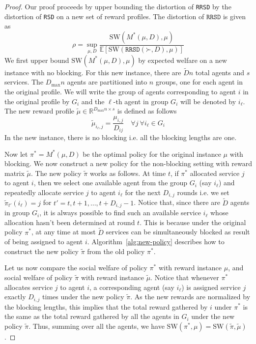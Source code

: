 \documentclass[letterpaper,11pt]{article}
\newcommand{\SW}{\textrm{SW}}
\begin{document}
\begin{proof}
    
Our proof proceeds by upper bounding the distortion of \texttt{RRSD} by the distortion of \texttt{RSD} on a new set of reward profiles. The distortion of $\texttt{RRSD}$ is given as
     $$
     \rho = \sup_{\mu,D} \frac{\textrm{SW}(M^{*}(\mu, D), \mu)}{\mathbb{E}[\textrm{SW}(\texttt{RRSD}(\mathord{\succ}, D), \mu)]}
     $$
     We first upper bound $\textrm{SW}(M^{*}(\mu, D), \mu)$ by expected welfare on a new instance with no blocking. For this new instance, there are $\tilde{D} n$ total agents and $s$ services. The $D_{\max} n$ agents are partitioned into $n$ groups, one for each agent in the original profile. We will write the group of agents corresponding to agent $i$ in the original profile by $G_i$ and the $\ell$-th agent in group $G_i$ will be denoted by $i_\ell$. The new reward profile $\tilde{\mu} \in \mathbb{R}^{D_{\max} n \times s}$ is defined as follows
     $$
     \tilde{\mu}_{i_\ell, j} = \frac{\mu_{i,j}}{D_{ij}} \quad \forall j \ \forall i_\ell \in G_i
     $$
     In the new instance, there is no blocking i.e. all the blocking lengths are one. 
     
     Now let $\pi^* = M^*(\mu,D)$ be the optimal policy for the original instance $\mu$ with blocking. We now construct a new policy for the non-blocking setting with reward matrix $\tilde{\mu}$. The new policy $\tilde{\pi}$ works as follows. At time $t$, if $\pi^*$ allocated service $j$  to agent $i$, then we select one available agent from the group $G_i$ (say $i_\ell$) and repeatedly allocate service $j$ to agent $i_\ell$ for the next $D_{i,j}$ rounds i.e. we set $\tilde{\pi}_{t'}(i_\ell) = j$ for $t'=t, t+1,\ldots, t+D_{i,j} - 1$. Notice that, since there are $\tilde{D}$ agents in group $G_i$, it is always possible to find such an available service $i_{\ell}$ whose allocation hasn't been determined at round $t$. This is because under the original policy $\pi^*$, at any time at most $\tilde{D}$ services can be simultaneously blocked as result of being assigned to agent $i$. Algorithm~\ref{alg:new-policy} describes how to construct the new policy $\tilde{\pi}$ from the old policy $\pi^*$.
     
     Let us now compare the social welfare of policy $\pi^*$ with reward instance $\mu$, and social welfare of policy $\tilde{\pi}$ with reward instance $\tilde{\mu}$. Notice that whenever $\pi^*$ allocates service $j$ to agent $i$, a corresponding agent (say $i_\ell$) is assigned service $j$ exactly $D_{i,j}$ times under the new policy $\tilde{\pi}$. As the new rewards are normalized by the blocking lengths, this implies that the total reward gathered by $i$ under $\pi^*$ is the same as the total reward gathered by all the agents in $G_i$ under the new policy $\tilde{\pi}$. Thus, summing over all the agents, we have $\SW(\pi^*, \mu) = \SW(\tilde{\pi}, \tilde{\mu})$. 
     

\end{proof}
\end{document}
